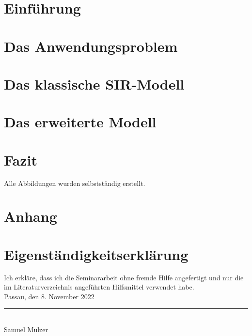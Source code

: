 \documentclass[a4paper, 12pt, titlepage]{scrartcl}
\title{\Title}
\subtitle{\Subject}
\author{\Author}
\date{8. November 2022}
\begin{document}
  \maketitle
  

  \renewcommand{\contentsname}{Inhaltsverzeichnis}
  \thispagestyle{empty}
  \tableofcontents
  \clearpage
  \newpage

  \setcounter{page}{3}

  \section*{Einführung}
  \label{sec:introduction}
  
  \newpage

  \section{Das Anwendungsproblem}
  \label{sec:problem}
  
  \newpage
  
  \section{Das klassische SIR-Modell}
  \label{sec:basic_model}
  
  \newpage

  \section{Das erweiterte Modell}
  \label{sec:extended_model}
  
  \newpage

  \section*{Fazit}
  \label{sec:conclusion}
  
  \newpage


  \renewcommand{\refname}{Literaturverzeichnis}
  \printbibliography
  \newpage

  \renewcommand{\listfigurename}{Abbildungsverzeichnis}
  \listoffigures
  \bigskip
  Alle Abbildungen wurden selbstständig erstellt.
  \newpage

  \section*{Anhang}
  \label{sec:appendix}
  
  \newpage

  \section*{Eigenständigkeitserklärung}
  Ich erkläre, dass ich die Seminararbeit ohne fremde Hilfe angefertigt und nur die im Literaturverzeichnis angeführten Hilfsmittel verwendet habe. \\[0.3cm]
  Passau, den 8. November 2022 \\[2cm]
  \rule{6cm}{.4pt} \\
  Samuel Mulzer
\end{document}
